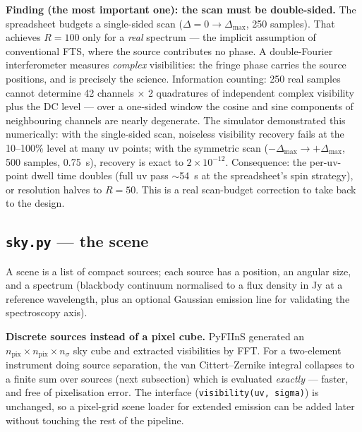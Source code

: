 \documentclass[11pt]{article}
\newcommand{\code}[1]{\texttt{\small #1}}
\newcommand{\file}[1]{\textcolor{plumdark}{\texttt{\small #1}}}
\begin{document}
\begin{flagbox}
\textbf{Finding (the most important one): the scan must be double-sided.}
The spreadsheet budgets a single-sided scan ($\Delta = 0 \to \Delta_{\max}$,
250 samples). That achieves $R=100$ only for a \emph{real} spectrum --- the
implicit assumption of conventional FTS, where the source contributes no
phase. A double-Fourier interferometer measures \emph{complex} visibilities:
the fringe phase carries the source positions, and is precisely the science.
Information counting: 250 real samples cannot determine 42 channels
$\times$ 2 quadratures of independent complex visibility plus the DC level
--- over a one-sided window the cosine and sine components of neighbouring
channels are nearly degenerate. The simulator demonstrated this numerically:
with the single-sided scan, noiseless visibility recovery fails at the
10--100\% level at many uv points; with the symmetric scan
($-\Delta_{\max} \to +\Delta_{\max}$, 500 samples, \SI{0.75}{\second}),
recovery is exact to $2\times 10^{-12}$. Consequence: the per-uv-point dwell
time doubles (full uv pass $\sim$\SI{54}{\second} at the spreadsheet's spin
strategy), or resolution halves to $R=50$. This is a real scan-budget
correction to take back to the design.
\end{flagbox}

\subsection{\file{sky.py} --- the scene}

A scene is a list of compact sources; each source has a position, an angular
size, and a spectrum (blackbody continuum normalised to a flux density in Jy
at a reference wavelength, plus an optional Gaussian emission line for
validating the spectroscopy axis).

\begin{decisionbox}
\textbf{Discrete sources instead of a pixel cube.} PyFIInS generated an
$n_\mathrm{pix}\times n_\mathrm{pix}\times n_\sigma$ sky cube and extracted
visibilities by FFT. For a two-element instrument doing source separation,
the van Cittert--Zernike integral collapses to a finite sum over sources
(next subsection) which is evaluated \emph{exactly} --- faster, and free of
pixelisation error. The interface (\code{visibility(uv, sigma)}) is
unchanged, so a pixel-grid scene loader for extended emission can be added
later without touching the rest of the pipeline.
\end{decisionbox}
\end{document}
